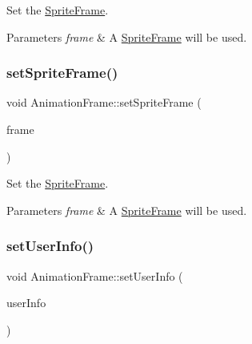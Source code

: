 Set the \hyperlink{classSpriteFrame}{Sprite\+Frame}.


\begin{DoxyParams}{Parameters}
{\em frame} & A \hyperlink{classSpriteFrame}{Sprite\+Frame} will be used. \\
\hline
\end{DoxyParams}
\mbox{\label{classAnimationFrame_afd21a7ef4ceb50204e79ed6e6ac80530}} 
\subsubsection{\texorpdfstring{set\+Sprite\+Frame()}{setSpriteFrame()}\hspace{0.1cm}{\footnotesize\ttfamily [2/2]}}
{\footnotesize\ttfamily void Animation\+Frame\+::set\+Sprite\+Frame (\begin{DoxyParamCaption}\item[{\hyperlink{classSpriteFrame}{Sprite\+Frame} $\ast$}]{frame }\end{DoxyParamCaption})\hspace{0.3cm}{\ttfamily [inline]}}

Set the \hyperlink{classSpriteFrame}{Sprite\+Frame}.


\begin{DoxyParams}{Parameters}
{\em frame} & A \hyperlink{classSpriteFrame}{Sprite\+Frame} will be used. \\
\hline
\end{DoxyParams}
\mbox{\label{classAnimationFrame_a5478d94008d0c0980e1618a4443f7c15}} 
\subsubsection{\texorpdfstring{set\+User\+Info()}{setUserInfo()}\hspace{0.1cm}{\footnotesize\ttfamily [1/2]}}
{\footnotesize\ttfamily void Animation\+Frame\+::set\+User\+Info (\begin{DoxyParamCaption}\item[{const Value\+Map \&}]{user\+Info }\end{DoxyParamCaption})\hspace{0.3cm}{\ttfamily [inline]}}

